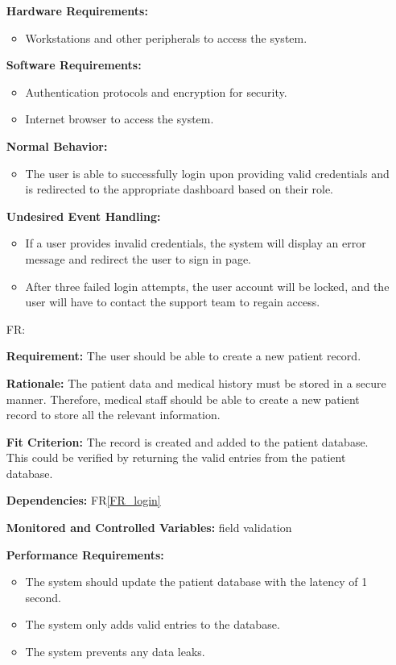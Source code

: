 \documentclass[12pt]{article}
\newcounter{reqnum} %
\begin{document}
\begin{itemize}
\textbf{Hardware Requirements:} 
\begin{itemize}
  \item Workstations and other peripherals to access the system.
\end{itemize}

\textbf{Software Requirements:} 
\begin{itemize}
  \item Authentication protocols and encryption for security. 
  \item Internet browser to access the system.
\end{itemize}

\textbf{Normal Behavior:} 
\begin{itemize}
  \item The user is able to successfully login upon providing valid credentials and is redirected to the appropriate dashboard based on their role.
\end{itemize}

\textbf{Undesired Event Handling:}
\begin{itemize}
  \item If a user provides invalid credentials, the system will display an error message and redirect the user to sign in page.
  \item After three failed login attempts, the user account will be locked, and the user will have to contact the support team to regain access.
\end{itemize}
 

\item[FR\refstepcounter{reqnum}\thereqnum \label{FR_createRecord}:]

\textbf{Requirement:} The user should be able to create a new patient record. 

\textbf{Rationale:} The patient data and medical history must be stored in a secure manner. Therefore, medical staff should be able to create a new patient record to store all the relevant information. 

\textbf{Fit Criterion:} The record is created and added to the patient database. This could be verified by returning the valid entries from the patient database.

\textbf{Dependencies:} FR\ref{FR_login}

\textbf{Monitored and Controlled Variables:} field validation

\textbf{Performance Requirements:} 
\begin{itemize}
  \item The system should update the patient database with the latency of 1 second. 
  \item The system only adds valid entries to the database.
  \item The system prevents any data leaks.
\end{itemize}


\end{itemize}
\end{document}
